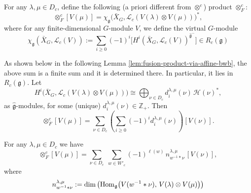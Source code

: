 \documentclass[12pt]{article}
\begin{document}
\begin{definition}
For any $\lambda,\mu\in D_c$, define the following (a priori different from $\otimes^c$) product $\otimes_F^c$:
\begin{equation}
[V(\lambda)]\otimes_F^c [V(\mu)]
=
\chi_{\mathfrak g}\bigl(\bar X_G,\mathcal L_c(V(\lambda)\otimes V(\mu))\bigr)^*,
\end{equation}
where for any finite-dimensional $G$-module $V$, we define the virtual $G$-module
\begin{equation}
\chi_{\mathfrak g}(\bar X_G,\mathcal L_c(V))
:=
\sum_{i\ge 0} (-1)^i
\bigl[
H^i(\bar X_G,\mathcal L_c(V))^{\hat{\mathfrak g}^{-}}
\bigr]
\in R_c(\mathfrak g)
\end{equation}

As shown below in the following Lemma \ref{lem:fusion-product-via-affine-bwb}, the above sum is a finite sum and it is determined there. In particular, it lies in $R_c(\mathfrak g)$. Let
\[
H^i\bigl(\bar X_G,\mathcal L_c(V(\lambda)\otimes V(\mu))\bigr)
\cong
\bigoplus_{\nu\in D_c}
d_i^{\lambda,\mu}(\nu)\,\mathcal H(\nu)^*,
\]
as $\hat{\mathfrak g}$-modules, for some (unique) $d_i^{\lambda,\mu}(\nu)\in \mathbb Z_+$. Then
\begin{equation}
[V(\lambda)]\otimes_F^c [V(\mu)]
=
\sum_{\nu\in D_c}
\left(
\sum_{i\ge 0} (-1)^i d_i^{\lambda,\mu}(\nu)
\right)
[V(\nu)].
\end{equation}
\end{definition}

\begin{lemma}\label{lem:fusion-product-via-affine-bwb}
For any $\lambda,\mu\in D_c$ we have
\begin{equation}
[V(\lambda)]\otimes_F^c [V(\mu)]
=
\sum_{\nu\in D_c}\;
\sum_{w\in W'_c}
(-1)^{\ell(w)}\, n_{w^{-1}*\nu}^{\lambda,\mu}\,[V(\nu)],
\end{equation}
where
\[
n_{w^{-1}*\nu}^{\lambda,\mu}
:=
\dim\left(
\operatorname{Hom}_{\mathfrak g}\bigl(V(w^{-1}*\nu),\,V(\lambda)\otimes V(\mu)\bigr)
\right)
\]
\end{lemma}
\end{document}
